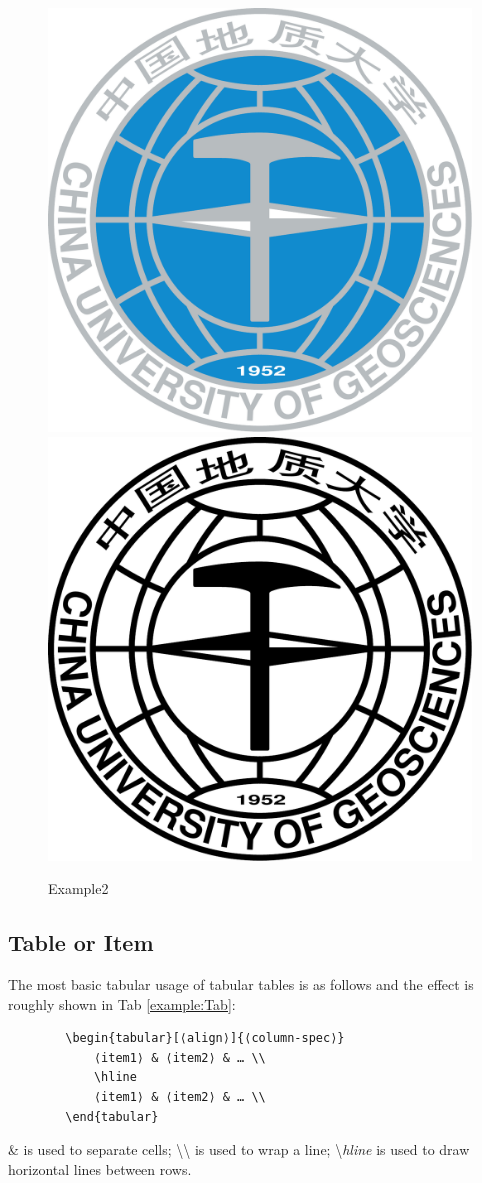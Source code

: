 \documentclass[twoside]{CUGCSthesis_EN}
\begin{document}
			\begin{figure} [H]
				\centering%
				{\includegraphics[height=0.45\textwidth]{Figures/CUG_Logo1}} 
				\hspace{0.01\textwidth}  
				{\includegraphics[height=0.45\textwidth]{Figures/CUG_Logo2}} 
				\caption{Example2} 
				\label{fig:figure_3col} 
			\end{figure} 
		
	\subsection{Table or Item}

	The most basic tabular usage of tabular tables is as follows and the effect is roughly shown in Tab \ref{example:Tab}:
	
	\begin{verbatim}
		\begin{tabular}[⟨align⟩]{⟨column-spec⟩}
			⟨item1⟩ & ⟨item2⟩ & … \\
			\hline
			⟨item1⟩ & ⟨item2⟩ & … \\
		\end{tabular}
	\end{verbatim}

	
	\& is used to separate cells;  {\textbackslash \textbackslash} is used to wrap a line; {\textbackslash}\textit{hline} is used to draw horizontal lines between rows.
\end{document}
